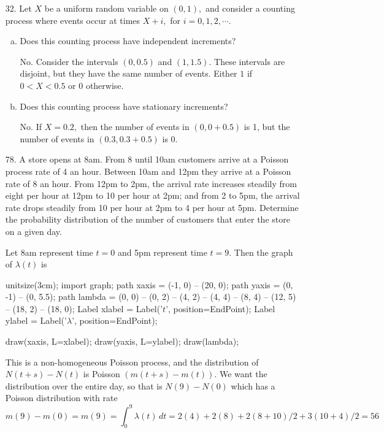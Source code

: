 \documentclass{article}
\begin{document}
\begin{itemize}
	\item[32.] Let $X$ be a uniform random variable on $(0, 1),$ and consider a counting process where events occur at times $X+i,$ for $i=0, 1, 2, \cdots.$ 
		\begin{enumerate}[(a)]
			\item Does this counting process have independent increments?
				\begin{answer*}
					No. Consider the intervals $(0, 0.5)$ and $(1, 1.5).$ These intervals are disjoint, but they have the same number of events. Either $1$ if $0<X<0.5$ or $0$ otherwise.
				\end{answer*}

				\newpage
			\item Does this counting process have stationary increments?
				\begin{answer*}
					No. If $X=0.2,$ then the number of events in $(0, 0+0.5)$ is 1, but the number of events in $(0.3, 0.3+0.5)$ is 0.
				\end{answer*}

		\end{enumerate}

	\item[78.] A store opens at 8am. From 8 until 10am customers arrive at a Poisson process rate of 4 an hour. Between 10am and 12pm they arrive at a Poisson rate of 8 an hour. From 12pm to 2pm, the arrival rate increases steadily from eight per hour at 12pm to 10 per hour at 2pm; and from 2 to 5pm, the arrival rate drops steadily from 10 per hour at 2pm to 4 per hour at 5pm. Determine the probability distribution of the number of customers that enter the store on a given day.
		\begin{soln}
			Let 8am represent time $t=0$ and 5pm represent time $t=9.$ Then the graph of $\lambda(t)$ is
			\begin{center}
				\begin{asy}
					unitsize(3cm);
					import graph;
					path xaxis = (-1, 0) -- (20, 0);
					path yaxis = (0, -1) -- (0, 5.5);
					path lambda = (0, 0) -- (0, 2) -- (4, 2) -- (4, 4) -- (8, 4) -- (12, 5) -- (18, 2) -- (18, 0);
					Label xlabel = Label('$t$', position=EndPoint);
					Label ylabel = Label('$\lambda$', position=EndPoint);

					draw(xaxis, L=xlabel);
					draw(yaxis, L=ylabel);
					draw(lambda);
				\end{asy}
			\end{center}
			This is a non-homogeneous Poisson process, and the distribution of $N(t+s)-N(t)$ is Poisson $(m(t+s)-m(t)).$ We want the distribution over the entire day, so that is $N(9)-N(0)$ which has a Poisson distribution with rate
			\[m(9)-m(0) = m(9) = \int_0^9 \lambda(t)\, dt = 2(4) + 2(8) + 2(8+10)/2 + 3(10+4)/2 = 56\]
		\end{soln}


\end{itemize}
\end{document}
